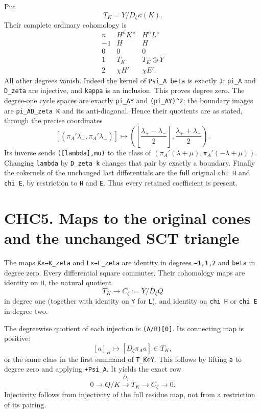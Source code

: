 Put \[
T_K=Y/D_\zeta\kappa(K).
\tag{CHC4.3}
\] Their complete ordinary cohomology is \[
\begin{array}{c|cc}
n&H^nK^\times&H^nL^\times\\\hline
-1&H&H\\
0&0&0\\
1&T_K&T_K\oplus Y\\
2&\chi H'&\chi E'.
\end{array}
\tag{CHC4.4}
\] All other degrees vanish. Indeed the kernel of \texttt{Psi\_A\ beta}
is exactly \texttt{J}: \texttt{pi\_A\textquotesingle{}} and
\texttt{D\_zeta} are injective, and \texttt{kappa} is an inclusion. This
proves degree zero. The degree-one cycle spaces are exactly
\texttt{pi\_A\textquotesingle{}Y} and
\texttt{(pi\_A\textquotesingle{}Y)\^{}2}; the boundary images are
\texttt{pi\_A\textquotesingle{}D\_zeta\ K} and its anti-diagonal. Hence
their quotients are as stated, through the precise coordinates \[
[(\pi_A'\lambda_+,\pi_A'\lambda_-)]
\longmapsto
\left(\left[\frac{\lambda_+-\lambda_-}{2}\right],
\frac{\lambda_++\lambda_-}{2}\right).
\tag{CHC4.5}
\] Its inverse sends \texttt{({[}lambda{]},mu)} to the class of
\((\pi_A'(\lambda+\mu),\pi_A'(-\lambda+\mu))\). Changing \texttt{lambda}
by \texttt{D\_zeta\ k} changes that pair by exactly a boundary. Finally
the cokernels of the unchanged last differentials are the full original
\texttt{chi\ H\textquotesingle{}} and \texttt{chi\ E\textquotesingle{}},
by restriction to \texttt{H} and \texttt{E}. Thus every retained
coefficient is present.

\section{CHC5. Maps to the original cones and the unchanged SCT
triangle}\label{chc5.-maps-to-the-original-cones-and-the-unchanged-sct-triangle}

The maps \texttt{K×→K\_zeta} and \texttt{L×→L\_zeta} are identity in
degrees \texttt{−1,1,2} and \texttt{beta} in degree zero. Every
differential square commutes. Their cohomology maps are identity on
\texttt{H}, the natural quotient \[
T_K\longrightarrow C_\zeta:=Y/D_\zeta Q
\] in degree one (together with identity on \texttt{Y} for \texttt{L}),
and identity on \texttt{chi\ H\textquotesingle{}} or
\texttt{chi\ E\textquotesingle{}} in degree two.

The degreewise quotient of each injection is \texttt{(A/B){[}0{]}}. Its
connecting map is positive: \[
[a]_B\longmapsto[D_\zeta\pi_Aa]\in T_K,
\tag{CHC5.1}
\] or the same class in the first summand of \texttt{T\_K⊕Y}. This
follows by lifting \texttt{a} to degree zero and applying
\texttt{+Psi\_A}. It yields the exact row \[
0\to Q/K\xrightarrow{\overline D_\zeta}T_K
\to C_\zeta\to0.
\tag{CHC5.2}
\] Injectivity follows from injectivity of the full residue map, not
from a restriction of its pairing.

